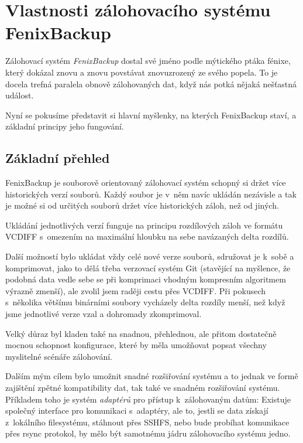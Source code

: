 \chapter{Vlastnosti zálohovacího systému FenixBackup}

Zálohovací systém {\it FenixBackup} dostal své jméno podle mýtického ptáka
fénixe, který dokázal znovu a znovu povstávat znovuzrozený ze svého popela. To
je docela trefná paralela obnově zálohovaných dat, když nás potká nějaká
nešťastná událost.

Nyní se pokusíme představit si hlavní myšlenky, na kterých FenixBackup staví,
a základní principy jeho fungování.

\section{Základní přehled}

FenixBackup je souborově orientovaný zálohovací systém schopný si držet více
historických verzí souborů. Každý soubor je v~něm navíc ukládán nezávisle a tak
je možné si od určitých souborů držet více historických záloh, než od jiných.

Ukládání jednotlivých verzí funguje na principu rozdílových záloh ve formátu
\gls{VCDIFF} s~omezením na maximální hloubku na sebe navázaných delta rozdílů.

Další možností bylo ukládat vždy celé nové verze souborů, sdružovat je k~sobě
a komprimovat, jako to dělá třeba verzovací systém Git (stavějící na myšlence,
že podobná data vedle sebe se při komprimaci vhodným kompresním algoritmem
výrazně zmenší), ale zvolil jsem raději cestu přes \gls{VCDIFF}. Při pokusech
s~několika většímu binárními soubory vycházely delta rozdíly menší, než když
jsme jednotlivé verze vzal a dohromady zkomprimoval.

Velký důraz byl kladen také na snadnou, přehlednou, ale přitom dostatečně mocnou
schopnost konfigurace, které by měla umožňovat popsat všechny myslitelné
scénáře zálohování.


Dalším mým cílem bylo umožnit snadné rozšiřování systému a to jednak ve formě
zajištění zpětné kompatibility dat, tak také ve snadném rozšiřování systému.
Příkladem toho je systém {\it adaptérů} pro přístup k~zálohovaným datům:
Existuje společný interface pro komunikaci s~adaptéry, ale to, jestli se data
získají z~lokálního filesystému, stáhnout přes \gls{SSHFS}, nebo bude probíhat
komunikace přes rsync protokol, by mělo být samotnému jádru zálohovacího
systému jedno.

